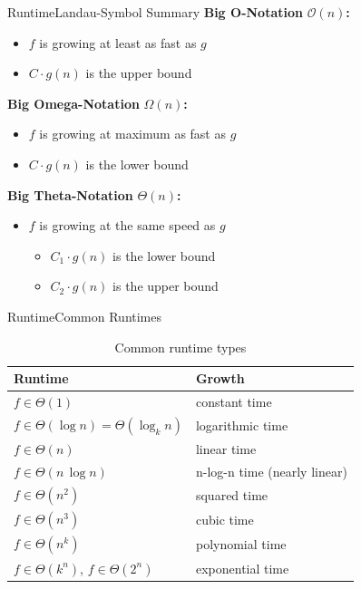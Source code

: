 \begin{frame}{Runtime}{Landau-Symbol Summary}
  \textbf{Big O-Notation} $\mathcal{O}(n)$\textbf{:}\\
    \begin{itemize}
      \item
        $f$ is growing {\color{Mittel-Blau}at least} as fast as $g$
      \item
        $C \cdot g(n)$ is the upper bound
    \end{itemize}
  \textbf{Big Omega-Notation} $\Omega(n)$\textbf{:}\\
  \begin{itemize}
    \item
      $f$ is growing {\color{Mittel-Blau}at maximum} as fast as $g$
    \item
      $C \cdot g(n)$ is the lower bound
  \end{itemize}
  \textbf{Big Theta-Notation} $\Theta(n)$\textbf{:}\\
  \begin{itemize}
    \item
      $f$ is growing at {\color{Mittel-Blau}the same} speed as $g$
      \begin{itemize}
        \item
          $C_1 \cdot g(n)$ is the lower bound
        \item
          $C_2 \cdot g(n)$ is the upper bound
      \end{itemize}
  \end{itemize}
\end{frame}


\begin{frame}{Runtime}{Common Runtimes}
  \begin{table}[!h]
    \begin{center}
      \caption{Common runtime types}
      \label{RuntimeTable}
      \begin{tabularx}{\textwidth}{XX}
        Runtime & Growth\\
        \hline
        $f \in \Theta (1)$ & constant time\\
        $f \in \Theta (\log n) = \Theta (\log_k n)$ & logarithmic time\\
        $f \in \Theta (n)$ & linear time\\
        $f \in \Theta (n \, \log n)$ & n-log-n time (nearly linear)\\
        \hline
        $f \in \Theta (n^2)$ & squared time\\
        $f \in \Theta (n^3)$ & cubic time\\
        $f \in \Theta (n^k)$ & polynomial time\\
        \hline
        $f \in \Theta (k^n)$, $f \in \Theta(2^n)$ & exponential time
      \end{tabularx}
    \end{center}
  \end{table}
\end{frame}

